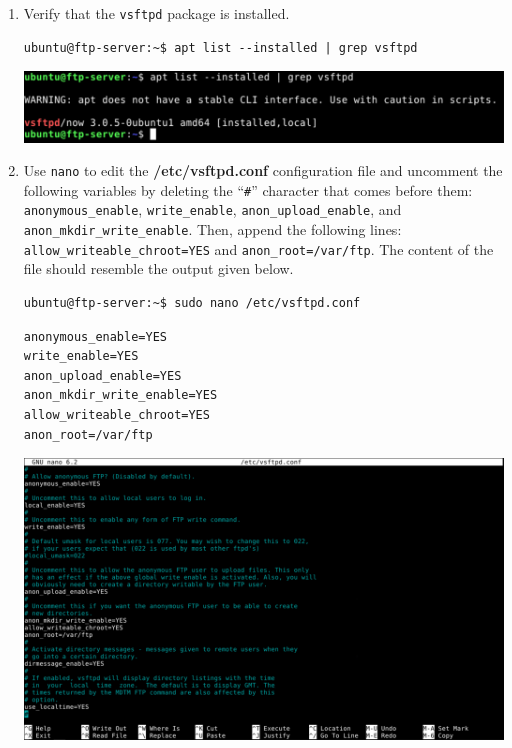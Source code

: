 \documentclass[letterpaper, 12pt]{article}
\begin{document}
\begin{enumerate}
    \item Verify that the \texttt{vsftpd} package is installed.
\begin{lstlisting}
ubuntu@ftp-server:~$ apt list --installed | grep vsftpd
\end{lstlisting}

    \begin{center}
        \includegraphics[width=\linewidth]{images/part1/step42.png}
    \end{center}

    \item Use \texttt{nano} to edit the \textbf{/etc/vsftpd.conf} configuration file and uncomment the following
    variables by deleting the ``\texttt{\#}'' character that comes before them: \texttt{anonymous\_enable},
    \texttt{write\_enable}, \texttt{anon\_upload\_enable}, and \texttt{anon\_mkdir\_write\_enable}. Then, append the
    following lines: \texttt{allow\_writeable\_chroot=YES} and \texttt{anon\_root=/var/ftp}. The content of the file
    should resemble the output given below.
\begin{lstlisting}
ubuntu@ftp-server:~$ sudo nano /etc/vsftpd.conf
\end{lstlisting}
\begin{lstlisting}
anonymous_enable=YES
write_enable=YES
anon_upload_enable=YES
anon_mkdir_write_enable=YES
allow_writeable_chroot=YES
anon_root=/var/ftp
\end{lstlisting}

    \begin{center}
        \includegraphics[width=\linewidth]{images/part1/step43.png}
    \end{center}


\end{enumerate}
\end{document}
